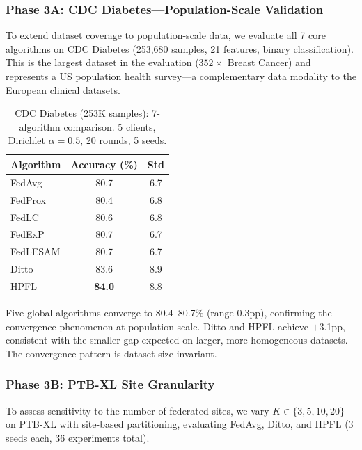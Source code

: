 \documentclass[conference]{IEEEtran}
\begin{document}
\subsubsection{Phase 3A: CDC Diabetes---Population-Scale Validation}
\label{sec:phase3a}

To extend dataset coverage to population-scale data, we evaluate all 7 core algorithms on CDC Diabetes (253,680 samples, 21 features, binary classification). This is the largest dataset in the evaluation ($352\times$ Breast Cancer) and represents a US population health survey---a complementary data modality to the European clinical datasets.

\begin{table}[htbp]
\centering
\caption{CDC Diabetes (253K samples): 7-algorithm comparison. 5 clients, Dirichlet $\alpha{=}0.5$, 20 rounds, 5 seeds.}
\label{tab:cdc_7algo}
\small
\begin{tabular}{lcc}
\toprule
\textbf{Algorithm} & \textbf{Accuracy (\%)} & \textbf{Std} \\
\midrule
FedAvg & 80.7 & 6.7 \\
FedProx & 80.4 & 6.8 \\
FedLC & 80.6 & 6.8 \\
FedExP & 80.7 & 6.7 \\
FedLESAM & 80.7 & 6.7 \\
\midrule
Ditto & 83.6 & 8.9 \\
HPFL & \textbf{84.0} & 8.8 \\
\bottomrule
\end{tabular}
\par{\footnotesize Five global algorithms converge to 80.4--80.7\% (range 0.3pp), confirming the convergence phenomenon at population scale. Ditto and HPFL achieve $+$3.1pp, consistent with the smaller gap expected on larger, more homogeneous datasets. The convergence pattern is dataset-size invariant.}
\end{table}

\subsubsection{Phase 3B: PTB-XL Site Granularity}
\label{sec:phase3b}

To assess sensitivity to the number of federated sites, we vary $K \in \{3, 5, 10, 20\}$ on PTB-XL with site-based partitioning, evaluating FedAvg, Ditto, and HPFL (3 seeds each, 36 experiments total).
\end{document}
